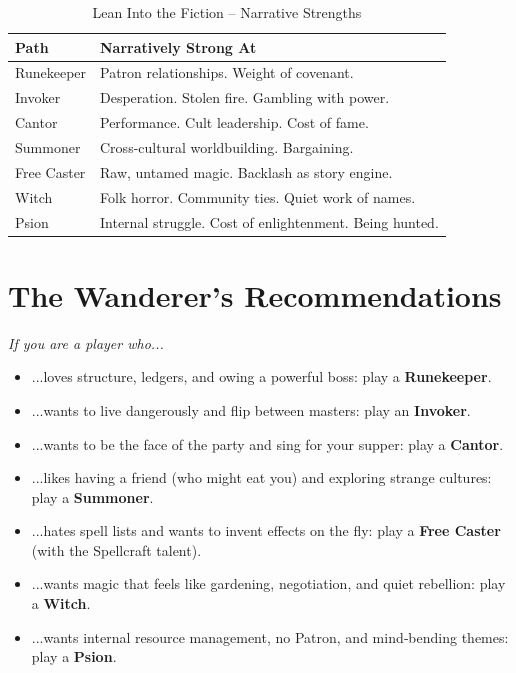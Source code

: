\documentclass[10pt,a5paper]{book}
\begin{document}
\vspace{0.5cm}

\begin{longtable}{p{2.5cm} p{5cm}}
\caption{Lean Into the Fiction -- Narrative Strengths}\\
\toprule
\textbf{Path} & \textbf{Narratively Strong At} \\
\midrule
Runekeeper & Patron relationships. Weight of covenant. \\
Invoker & Desperation. Stolen fire. Gambling with power. \\
Cantor & Performance. Cult leadership. Cost of fame. \\
Summoner & Cross-cultural worldbuilding. Bargaining. \\
Free Caster & Raw, untamed magic. Backlash as story engine. \\
Witch & Folk horror. Community ties. Quiet work of names. \\
Psion & Internal struggle. Cost of enlightenment. Being hunted. \\
\bottomrule
\end{longtable}
\normalsize

\section*{The Wanderer's Recommendations}

\noindent \textit{If you are a player who...}

\begin{itemize}
    \item ...loves structure, ledgers, and owing a powerful boss: play a \textbf{Runekeeper}.
    \item ...wants to live dangerously and flip between masters: play an \textbf{Invoker}.
    \item ...wants to be the face of the party and sing for your supper: play a \textbf{Cantor}.
    \item ...likes having a friend (who might eat you) and exploring strange cultures: play a \textbf{Summoner}.
    \item ...hates spell lists and wants to invent effects on the fly: play a \textbf{Free Caster} (with the Spellcraft talent).
    \item ...wants magic that feels like gardening, negotiation, and quiet rebellion: play a \textbf{Witch}.
    \item ...wants internal resource management, no Patron, and mind‑bending themes: play a \textbf{Psion}.
\end{itemize}
\end{document}
